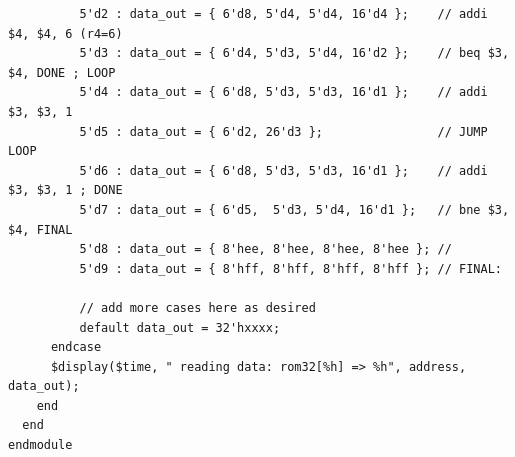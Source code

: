 \documentclass[12pt]{article}
\begin{document}
{\begin{verbatim}
          5'd2 : data_out = { 6'd8, 5'd4, 5'd4, 16'd4 };    // addi $4, $4, 6 (r4=6)
          5'd3 : data_out = { 6'd4, 5'd3, 5'd4, 16'd2 };    // beq $3, $4, DONE ; LOOP
          5'd4 : data_out = { 6'd8, 5'd3, 5'd3, 16'd1 };    // addi $3, $3, 1
          5'd5 : data_out = { 6'd2, 26'd3 };                // JUMP LOOP
          5'd6 : data_out = { 6'd8, 5'd3, 5'd3, 16'd1 };    // addi $3, $3, 1 ; DONE
          5'd7 : data_out = { 6'd5,  5'd3, 5'd4, 16'd1 };   // bne $3, $4, FINAL
          5'd8 : data_out = { 8'hee, 8'hee, 8'hee, 8'hee }; //
          5'd9 : data_out = { 8'hff, 8'hff, 8'hff, 8'hff }; // FINAL:

          // add more cases here as desired
          default data_out = 32'hxxxx;
      endcase
      $display($time, " reading data: rom32[%h] => %h", address, data_out);
    end
  end
endmodule
\end{verbatim}
}
\end{document}
